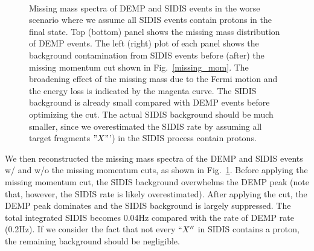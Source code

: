 \begin{figure}[!ht]
 \begin{center}
\\

   \caption[Missing Mass]{\footnotesize{Missing mass spectra of DEMP and SIDIS
events in the worse scenario where we assume all SIDIS events contain protons in the final state. 
Top (bottom) panel shows the missing mass distribution of DEMP events.
The left (right) plot of each panel shows the background contamination from
SIDIS events before (after) the missing momentum cut shown in
Fig.~\ref{missing_mom}. The broadening effect of the missing mass due to the
Fermi motion and the energy loss is indicated by the magenta curve. The SIDIS
background is already small compared with DEMP events before optimizing the
cut. The actual SIDIS background should be much smaller, since we overestimated
the SIDIS rate by assuming all target fragments $"X"$') in the SIDIS process
contain protons.}}
  \label{missing_mass}
  \end{center}
\end{figure}

We then reconstructed the missing mass spectra of the DEMP and SIDIS events w/
and w/o the missing momentum cuts, as shown in Fig.~\ref{missing_mass}. Before
applying the missing momentum cut, the SIDIS background overwhelms the DEMP
peak (note that, however, the SIDIS rate is likely overestimated). After
applying the cut, the DEMP peak dominates and the SIDIS background is largely
suppressed. The total integrated SIDIS becomes 0.04Hz compared with the rate of DEMP rate (0.2Hz).
 If we consider the fact that not every $``X''$ in SIDIS contains a
proton, the remaining background should be negligible.

